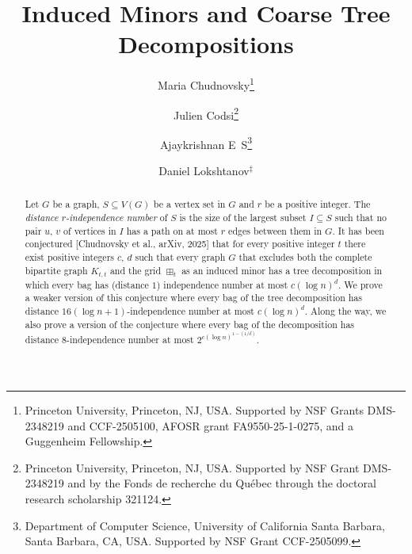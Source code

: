 \renewcommand{\theHtheorem}{\theHsection.\arabic{theorem}}
\renewcommand{\theHdefinition}{\theHsection.\arabic{definition}}
\renewcommand{\theHconjecture}{\theHsection.\arabic{conjecture}}

\newcommand{\red}[1]{\textcolor{red}{#1}}
\newcommand{\blue}[1]{\textcolor{blue}{#1}}

\newcommand{\correct}[1]{\textcolor{red}{#1}}
\newcommand{\restate}[1]{\textcolor{dullblue}{#1}}
\newcommand{\elaborate}[1]{\textcolor{brown}{#1}}


\newcommand{\f}{\mathcal{F}}
\newcommand{\cf}{\mathcal{C}_{\mathcal{F}}}
\newcommand{\q}{\mathcal{Q}}
\newcommand{\p}{\mathcal{P}}
\newcommand{\w}{\omega\xspace}
\newcommand{\tw}{tw\xspace}
\newcommand{\atw}{tw_{\alpha}\xspace}
\newcommand{\lpopt}{LP_{opt}}
\newcommand{\modi}{|I|}
\newcommand{\modf}{|\mathcal{F}|}
\newcommand{\fcov}{\mathrm{fcov}_{\mathcal{F}}}
\newcommand{\cov}{\mathrm{cov}_{\mathcal{F}}}
\newcommand{\tg}{\widetilde{G}}


\title{Induced Minors and Coarse Tree Decompositions}
\author{Maria Chudnovsky\thanks{Princeton University, Princeton, NJ, USA. Supported by NSF Grants DMS-2348219 and CCF-2505100,  AFOSR grant FA9550-25-1-0275, and a Guggenheim Fellowship.} \and
Julien Codsi\thanks{Princeton University, Princeton, NJ, USA. Supported by NSF Grant DMS-2348219 and by the Fonds de recherche du Québec through the doctoral research scholarship 321124.} \and
Ajaykrishnan E~S\thanks{Department of Computer Science, University of California Santa Barbara, Santa Barbara, CA, USA. Supported by NSF Grant CCF-2505099.} \and
Daniel Lokshtanov$^{\ddagger}$
}
\date{}



\maketitle

\begin{abstract}
Let $G$ be a graph, $S \subseteq V(G)$ be a vertex set in $G$ and $r$ be a positive integer. The {\em distance $r$-independence number} of $S$ is the size of the largest subset $I \subseteq S$ such that no pair $u$, $v$ of vertices in $I$ has a path on at most $r$ edges between them in $G$.
%
It has been conjectured [Chudnovsky et al., arXiv, 2025]
that for every positive integer $t$ there exist positive integers $c$, $d$ such that every graph $G$ that excludes both the complete bipartite graph $K_{t,t}$ and the grid $\boxplus_t$ as an induced minor has a tree decomposition in which every bag has (distance $1$) independence number at most $c(\log n)^d$. 
%
We prove a weaker version of this conjecture where every bag of the tree decomposition has distance $16(\log n + 1)$-independence number at most $c(\log n)^d$.
%
Along the way, we also prove a version of the conjecture where every bag of the decomposition has distance $8$-independence number at most $2^{c (\log n)^{1-(1/d)}}$.
\end{abstract}

